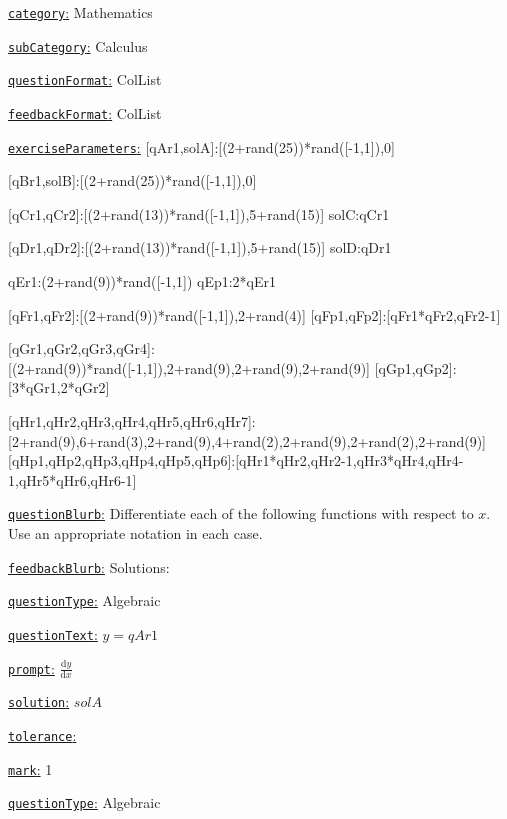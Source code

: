 \documentclass[preview]{standalone}
\newcommand \fieldname[1]{\underline{\texttt{#1}:}}
\begin{document}
\fieldname{category}  %
Mathematics

\fieldname{subCategory} %
Calculus

\fieldname{questionFormat}
ColList

\fieldname{feedbackFormat}
ColList

\fieldname{exerciseParameters}
[qAr1,solA]:[(2+rand(25))*rand([-1,1]),0]

[qBr1,solB]:[(2+rand(25))*rand([-1,1]),0]

[qCr1,qCr2]:[(2+rand(13))*rand([-1,1]),5+rand(15)]
solC:qCr1

[qDr1,qDr2]:[(2+rand(13))*rand([-1,1]),5+rand(15)]
solD:qDr1

qEr1:(2+rand(9))*rand([-1,1])
qEp1:2*qEr1

[qFr1,qFr2]:[(2+rand(9))*rand([-1,1]),2+rand(4)]
[qFp1,qFp2]:[qFr1*qFr2,qFr2-1]

[qGr1,qGr2,qGr3,qGr4]:[(2+rand(9))*rand([-1,1]),2+rand(9),2+rand(9),2+rand(9)]
[qGp1,qGp2]:[3*qGr1,2*qGr2]

[qHr1,qHr2,qHr3,qHr4,qHr5,qHr6,qHr7]:[2+rand(9),6+rand(3),2+rand(9),4+rand(2),2+rand(9),2+rand(2),2+rand(9)]
[qHp1,qHp2,qHp3,qHp4,qHp5,qHp6]:[qHr1*qHr2,qHr2-1,qHr3*qHr4,qHr4-1,qHr5*qHr6,qHr6-1]

\fieldname{questionBlurb}
Differentiate each of the following functions with respect to $x$. Use an appropriate notation in each case.

\fieldname{feedbackBlurb}
Solutions:

\fieldname{questionType}
Algebraic

\fieldname{questionText}
$y = {qAr1}$

\fieldname{prompt}
$\frac{\textrm{d}y}{\textrm{d}x}$

\fieldname{solution}
${solA}$

\fieldname{tolerance}


\fieldname{mark}
1

\fieldname{questionType}
Algebraic
\end{document}
